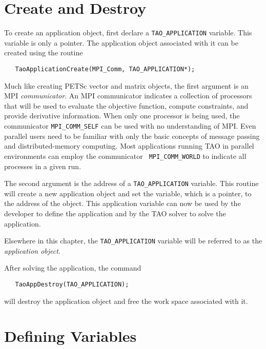 \section{Create and Destroy}
To create an application object, first
declare a {\tt TAO\_APPLICATION} variable.
This variable is only a pointer.  
The application object associated with it can be created using
the routine 
\begin{verbatim}
   TaoApplicationCreate(MPI_Comm, TAO_APPLICATION*);
\end{verbatim}
\noindent
Much like creating PETSc vector and matrix objects, 
the first argument is an MPI {\em communicator}.
An MPI \cite{using-mpi} communicator
indicates a collection of processors that will be used to evaluate the
objective function, compute constraints, and provide derivative information.
When only one processor is being used, the communicator {\tt MPI\_COMM\_SELF}
can be used with no understanding of MPI.
Even parallel users need to be familiar with only the basic concepts 
of message passing and  distributed-memory computing. 
Most applications running TAO in
parallel environments can employ the communicator {\tt
MPI\_COMM\_WORLD} to indicate all processes in a given run.

The second argument is the address of a  {\tt TAO\_APPLICATION} variable.  This
routine will create a new application object and set the variable, which is a pointer,
to the address of the object.   This application variable can now be used
by the developer to define the application and by the 
TAO solver to solve the application.

Elsewhere in this chapter, the {\tt TAO\_APPLICATION} variable will be referred
to as the {\em application object}.

After solving the application, the command 
\begin{verbatim}
   TaoAppDestroy(TAO_APPLICATION);
\end{verbatim}
\noindent
will destroy the application object and free 
the work space associated with it.

\section{Defining Variables}


